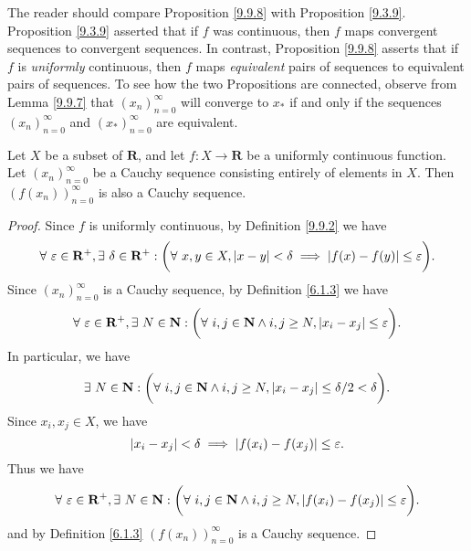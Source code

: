 \begin{remark}\label{9.9.9}
    The reader should compare Proposition \ref{9.9.8} with Proposition \ref{9.3.9}.
    Proposition \ref{9.3.9} asserted that if \(f\) was continuous, then \(f\) maps convergent sequences to convergent sequences.
    In contrast, Proposition \ref{9.9.8} asserts that if \(f\) is \emph{uniformly} continuous, then \(f\) maps \emph{equivalent} pairs of sequences to equivalent pairs of sequences.
    To see how the two Propositions are connected, observe from Lemma \ref{9.9.7} that \((x_n)_{n = 0}^\infty\) will converge to \(x_*\) if and only if the sequences \((x_n)_{n = 0}^\infty\) and \((x_*)_{n = 0}^\infty\) are equivalent.
\end{remark}

\setcounter{theorem}{11}
\begin{proposition}\label{9.9.12}
    Let \(X\) be a subset of \(\mathbf{R}\), and let \(f : X \to \mathbf{R}\) be a uniformly continuous function.
    Let \((x_n)_{n = 0}^\infty\) be a Cauchy sequence consisting entirely of elements in \(X\).
    Then \((f(x_n))_{n = 0}^\infty\) is also a Cauchy sequence.
\end{proposition}

\begin{proof}
    Since \(f\) is uniformly continuous, by Definition \ref{9.9.2} we have
    \[
        \forall\ \varepsilon \in \mathbf{R}^+, \exists\ \delta \in \mathbf{R}^+ : \bigg(\forall\ x, y \in X, \abs*{x - y} < \delta \implies \abs*{f(x) - f(y)} \leq \varepsilon\bigg).
    \]
    Since \((x_n)_{n = 0}^\infty\) is a Cauchy sequence, by Definition \ref{6.1.3} we have
    \[
        \forall\ \varepsilon \in \mathbf{R}^+, \exists\ N \in \mathbf{N} : \bigg(\forall\ i, j \in \mathbf{N} \land i, j \geq N, \abs*{x_i - x_j} \leq \varepsilon\bigg).
    \]
    In particular, we have
    \[
        \exists\ N \in \mathbf{N} : \bigg(\forall\ i, j \in \mathbf{N} \land i, j \geq N, \abs*{x_i - x_j} \leq \delta / 2 < \delta\bigg).
    \]
    Since \(x_i, x_j \in X\), we have
    \[
        \abs*{x_i - x_j} < \delta \implies \abs*{f(x_i) - f(x_j)} \leq \varepsilon.
    \]
    Thus we have
    \[
        \forall\ \varepsilon \in \mathbf{R}^+, \exists\ N \in \mathbf{N} : \bigg(\forall\ i, j \in \mathbf{N} \land i, j \geq N, \abs*{f(x_i) - f(x_j)} \leq \varepsilon\bigg).
    \]
    and by Definition \ref{6.1.3} \((f(x_n))_{n = 0}^\infty\) is a Cauchy sequence.
\end{proof}